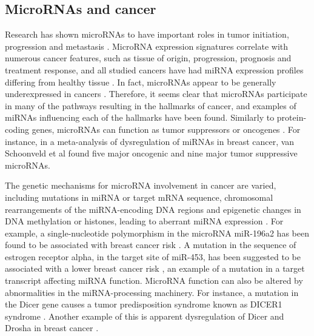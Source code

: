 \subsection{MicroRNAs and cancer}

Research has shown microRNAs to have important roles in tumor initiation,
progression and metastasis \citep{Lin2015}. MicroRNA expression signatures
correlate with numerous cancer features, such as tissue of origin, 
progression, prognosis and treatment response, and all studied cancers
have had miRNA expression profiles differing from healthy tissue
\citep{Calin2006}. In fact, microRNAs appear to be generally underexpressed in
cancers \citep{Lu2005}. Therefore, it seems clear that microRNAs participate
in many of the pathways resulting in the hallmarks of cancer, and
examples of miRNAs influencing each of the hallmarks have been found.
Similarly to protein-coding genes, microRNAs can function as tumor
suppressors or oncogenes \citep{Lin2015}. For instance, in a
meta-analysis of dysregulation of miRNAs in breast cancer, van Schoonveld
et al \citep{vanSchooneveld2015} found five major oncogenic and nine major tumor suppressive microRNAs.


The genetic mechanisms for microRNA involvement in cancer are varied,
including mutations in miRNA or target mRNA sequence, chromosomal
rearrangements of the miRNA-encoding DNA regions and epigenetic changes in DNA
methylation or histones, leading to aberrant miRNA expression
\citep{Calin2006,Melo2011}. For example, a single-nucleotide polymorphism
in the microRNA miR-196a2 has been found to be associated with breast cancer
risk \citep{Gao2011}. A mutation in the sequence of estrogen receptor alpha,
in the target site of miR-453, has been suggested to be associated with a
lower breast cancer risk \citep{Tchatchou2009}, an example of a mutation in
a target transcript affecting miRNA function. MicroRNA function can also be
altered by abnormalities in the miRNA-processing machinery. For instance, a
mutation in the Dicer gene causes a tumor predisposition syndrome known as
DICER1 syndrome \citep{Slade2011}. Another example of this is apparent
dysregulation of Dicer and Drosha in breast cancer \citep{Yan2012}.

